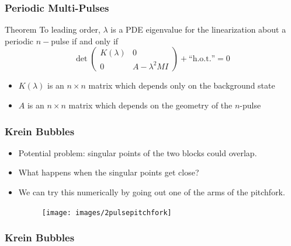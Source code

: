 \documentclass[16pt]{beamer}
\begin{document}
\begin{frame}
\frametitle{Periodic Multi-Pulses} 
	\fontsize{16}{7.2}\selectfont
    \begin{block}{Theorem}
    To leading order, $\lambda$ is a PDE eigenvalue for the linearization about a periodic $n-$pulse if and only if 
    \[
    \det\begin{pmatrix}K(\lambda) & 0 \\ 0 & A - \lambda^2  M I \end{pmatrix} + \text{``h.o.t.''} = 0
    \]
    \begin{itemize}
    	\item $K(\lambda)$ is an $n \times n$ matrix which depends only on the background state
    	\item $A$ is an $n \times n$ matrix which depends on the geometry of the $n$-pulse
    \end{itemize}
    \end{block}
\end{frame}

\begin{frame}
	\frametitle{Krein Bubbles}
	\fontsize{16}{7.2}\selectfont
	\begin{itemize}
		\item Potential problem: singular points of the two blocks could overlap.
		\vspace{0.5cm}
		\item What happens when the singular points get close?
		\vspace{0.5cm}
		\item We can try this numerically by going out one of the arms of the pitchfork.

		\begin{figure}
		\begin{center}
		\texttt{[image: images/2pulsepitchfork]}
		\end{center}
		\end{figure}
	\end{itemize}
\end{frame}

\begin{frame}
	\frametitle{Krein Bubbles}
	\fontsize{16}{7.2}\selectfont
	\begin{center}
	\end{center}
\end{frame}
\end{document}
